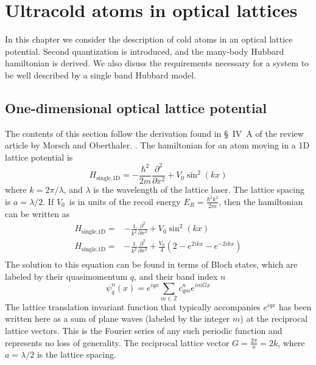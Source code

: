 \documentclass[oneside,11pt]{memoir}
\newcommand{\vo}{\ensuremath{V_{0}}}
\newcommand{\er}{\ensuremath{E_{R}}}
\begin{document}

\chapter{Ultracold atoms in optical lattices}

In this chapter we consider the description of cold atoms in an optical lattice
potential.    Second quantization is introduced, and the many-body Hubbard
hamiltonian is derived.  
We also disuss the requirements necessary for a system to be well described by
a single band Hubbard model.  


\section{One-dimensional optical lattice potential}

The contents of this section follow the derivation found in \S~IV~A of the
review article by Morsch and Oberthaler.  \cite{RevModPhys.78.179}.  The
hamiltonian for an atom moving in a 1D lattice potential is 
\begin{equation}
  H_{\text{single,1D}} = 
  - \frac{\hbar^{2}}{2m} \frac{\partial^{2}}{\partial x^{2}} 
  + \vo\sin^{2}(kx) 
 \label{eq:Hsingle1D}
\end{equation}
where $k=2\pi/\lambda$, and $\lambda$ is the wavelength of the lattice laser.
The lattice spacing is $a=\lambda/2$.  If \vo\ is in units of the recoil energy
$\er=\frac{\hbar^{2}k^{2}}{2m}$, then the hamiltonian can be written as
\begin{equation}
\begin{split}
  H_{\text{single,1D}}= &
    -\frac{1}{k^{2}} \frac{\partial^{2}}{\partial x^{2}} 
    + \vo\sin^{2}(kx) \\
  H_{\text{single,1D}} = &
    -\frac{1}{k^{2}} \frac{\partial^{2}}{\partial x^{2}} 
    + \frac{\vo}{4}(2 - e^{2ikx} - e^{-2ikx} )  \\
\end{split}
\end{equation}
The solution to this equation can be found in terms of Bloch states, which are
labeled by their quasimomentum $q$, and their band index $n$ \begin{equation}
  \psi_{q}^{n}(x) = e^{iqx} \sum_{m \in \mathbb{Z}} c_{qm}^{n} e^{imGx}
  \label{eq:blochstate}
\end{equation}
The lattice translation invariant function that typically accompanies $e^{iqx}$
has been written here as a sum of plane waves (labeled by the integer $m$) at
the reciprocal lattice vectors.  This is the Fourier series of any such
periodic function and represents no loss of generality.   The reciprocal
lattice vector  $G=\frac{2\pi}{a}=2k$, where $a=\lambda/2$ is the lattice
spacing.  
\end{document}
